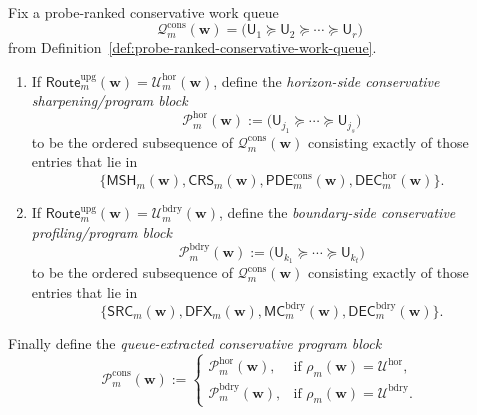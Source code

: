 \begin{definition}
\label{def:queue-extracted-conservative-sharpening-program-block}
Fix a probe-ranked conservative work queue
\[
  \mathcal Q^{\mathrm{cons}}_{m}(\mathbf w)
  =
  \bigl(\mathsf U_1\succcurlyeq \mathsf U_2\succcurlyeq \cdots \succcurlyeq \mathsf U_r\bigr)
\]
from Definition~\ref{def:probe-ranked-conservative-work-queue}.
\begin{enumerate}[label=(\roman*)]
  \item If \(\mathsf{Route}^{\mathrm{upg}}_{m}(\mathbf w)=\mathcal U^{\mathrm{hor}}_{m}(\mathbf w)\), define the \emph{horizon-side conservative sharpening/program block}
  \[
    \mathcal P^{\mathrm{hor}}_{m}(\mathbf w)
    :=
    \bigl(\mathsf U_{j_1}\succcurlyeq \cdots \succcurlyeq \mathsf U_{j_s}\bigr)
  \]
  to be the ordered subsequence of \(\mathcal Q^{\mathrm{cons}}_{m}(\mathbf w)\) consisting exactly of those entries that lie in
  \[
    \{\mathsf{MSH}_{m}(\mathbf w),\mathsf{CRS}_{m}(\mathbf w),\mathsf{PDE}^{\mathrm{cons}}_{m}(\mathbf w),\mathsf{DEC}^{\mathrm{hor}}_{m}(\mathbf w)\}.
  \]
  \item If \(\mathsf{Route}^{\mathrm{upg}}_{m}(\mathbf w)=\mathcal U^{\mathrm{bdry}}_{m}(\mathbf w)\), define the \emph{boundary-side conservative profiling/program block}
  \[
    \mathcal P^{\mathrm{bdry}}_{m}(\mathbf w)
    :=
    \bigl(\mathsf U_{k_1}\succcurlyeq \cdots \succcurlyeq \mathsf U_{k_t}\bigr)
  \]
  to be the ordered subsequence of \(\mathcal Q^{\mathrm{cons}}_{m}(\mathbf w)\) consisting exactly of those entries that lie in
  \[
    \{\mathsf{SRC}_{m}(\mathbf w),\mathsf{DFX}_{m}(\mathbf w),\mathsf{MC}^{\mathrm{bdry}}_{m}(\mathbf w),\mathsf{DEC}^{\mathrm{bdry}}_{m}(\mathbf w)\}.
  \]
\end{enumerate}
Finally define the \emph{queue-extracted conservative program block}
\[
  \mathcal P^{\mathrm{cons}}_{m}(\mathbf w)
  :=
  \begin{cases}
    \mathcal P^{\mathrm{hor}}_{m}(\mathbf w), & \text{if }\rho_m(\mathbf w)=\mathcal U^{\mathrm{hor}},\\[2mm]
    \mathcal P^{\mathrm{bdry}}_{m}(\mathbf w), & \text{if }\rho_m(\mathbf w)=\mathcal U^{\mathrm{bdry}}.
  \end{cases}
\]
\end{definition}

